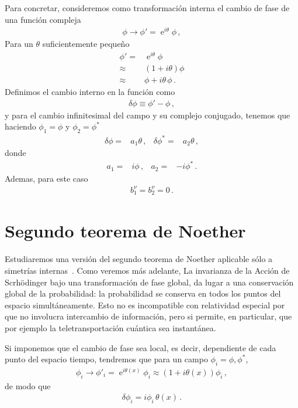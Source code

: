 Para concretar, consideremos como transformación interna el cambio de fase de una función compleja
\begin{align}
  \phi\to \phi'=\operatorname{e}^{i\theta}\phi\,,  
\end{align}
Para un $\theta$ suficientemente pequeño
\begin{align}
  \phi'=&\operatorname{e}^{i\theta}\phi \nonumber\\
    \approx&(1+i \theta)\phi \nonumber\\
    \approx&\phi+i \theta\, \phi\,.
\end{align}
Definimos el cambio interno en la función como
\begin{align}
  \delta\phi\equiv \phi'-\phi\,,
\end{align}
y para el cambio infinitesimal del campo y su complejo conjugado, tenemos que haciendo $\phi_1=\phi$ y $\phi_2=\phi^{*}$
\begin{align}
  \delta\phi=&a_1 \theta\,, &  \delta\phi^{*}=&  a_2 \theta\,, 
\end{align}
donde
\begin{align}
  a_1=& i\phi \,, & a_2=&-i\phi^{*}\,.
\end{align}
Ademas, para este caso
\begin{align}
  b_1^\nu=b_2^\nu=0\,.
\end{align}


\section{Segundo teorema de Noether}

Estudiaremos  una versión del segundo teorema de Noether aplicable sólo a simetrías internas~\cite{La version general del teorema incluye el caso de la relatividad general}. Como veremos más adelante, La invarianza de la Acción de Scrhödinger bajo una transformación de fase global, da lugar a una conservación global de la probabilidad: la probabilidad se conserva en todos los puntos del espacio simultáneamente. Esto no es incompatible con relatividad especial por que no involucra intercambio de información, pero si permite, en particular, que por ejemplo la teletransportación cuántica sea instantánea.

Si imponemos que el cambio de fase sea local, es decir, dependiente de cada punto  del espacio tiempo, tendremos que para un campo $\phi_{i}=\phi,\phi^{*}$,
\begin{align}
  \phi_i\to \phi'_i=\operatorname{e}^{i \theta(x)}\phi_i\approx (1+i\theta(x))\phi_i \,,
\end{align}
de modo que
\begin{align}
  \delta\phi_i=i  \phi_i\,\theta(x)\,.
\end{align}

